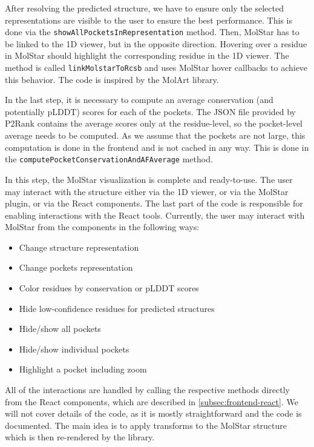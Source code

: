 After resolving the predicted structure, we have to ensure only the selected representations are visible to the user to ensure the best performance. This is done via the \texttt{showAllPocketsInRepresentation} method. Then, MolStar has to be linked to the 1D viewer, but in the opposite direction. Hovering over a residue in MolStar should highlight the corresponding residue in the 1D viewer. The method is called \texttt{linkMolstarToRcsb} and uses MolStar hover callbacks to achieve this behavior. The code is inspired by the MolArt library. \cite{molart}

In the last step, it is necessary to compute an average conservation (and potentially pLDDT) scores for each of the pockets. The JSON file provided by P2Rank contains the average scores only at the residue-level, so the pocket-level average needs to be computed. As we assume that the pockets are not large, this computation is done in the frontend and is not cached in any way. This is done in the \texttt{computePocketConservationAndAFAverage} method.

In this step, the MolStar visualization is complete and ready-to-use. The user may interact with the structure either via the 1D viewer, or via the MolStar plugin, or via the React components. The last part of the code is responsible for enabling interactions with the React tools. Currently, the user may interact with MolStar from the components in the following ways:

\begin{itemize}
    \item Change structure representation
    \item Change pockets representation
    \item Color residues by conservation or pLDDT scores
    \item Hide low-confidence residues for predicted structures
    \item Hide/show all pockets
    \item Hide/show individual pockets
    \item Highlight a pocket including zoom
\end{itemize}

All of the interactions are handled by calling the respective methods directly from the React components, which are described in \cref{subsec:frontend-react}. We will not cover details of the code, as it is mostly straightforward and the code is documented. The main idea is to apply transforms to the MolStar structure which is then re-rendered by the library.

